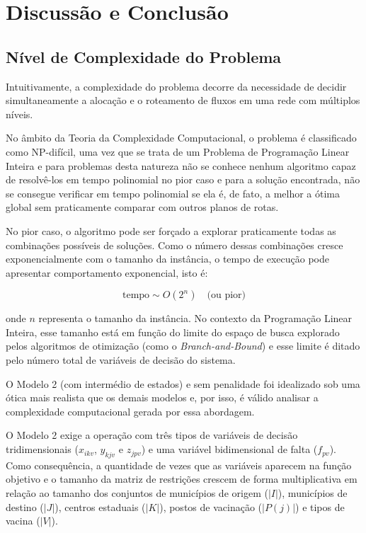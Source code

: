 \chapter{Discussão e Conclusão}

\section{Nível de Complexidade do Problema}

Intuitivamente, a complexidade do problema decorre da necessidade de decidir simultaneamente a alocação e o roteamento de fluxos em uma rede com múltiplos níveis.

No âmbito da Teoria da Complexidade Computacional, o problema é classificado como NP-difícil, uma vez que se trata de um Problema de Programação Linear Inteira e para problemas desta natureza não se conhece nenhum algoritmo capaz de resolvê-los em tempo polinomial no pior caso e para a solução encontrada, não se consegue verificar em tempo polinomial se ela é, de fato, a melhor a ótima global sem praticamente comparar com outros planos de rotas.

No pior caso, o algoritmo pode ser forçado a explorar praticamente todas as combinações possíveis de soluções. Como o número dessas combinações cresce exponencialmente com o tamanho da instância, o tempo de execução pode apresentar comportamento exponencial, isto é:

\[
\text{tempo} \sim O(2^n) \quad \text{(ou pior)}
\]

onde $n$ representa o tamanho da instância. No contexto da Programação Linear Inteira, esse tamanho está em função do limite do espaço de busca explorado pelos algoritmos de otimização (como o \textit{Branch-and-Bound}) e esse limite é ditado pelo número total de variáveis de decisão do sistema.

O Modelo 2 (com intermédio de estados) e sem penalidade foi idealizado sob uma ótica mais realista que os demais modelos e, por isso, é válido analisar a complexidade computacional gerada por essa abordagem.

O Modelo 2 exige a operação com três tipos de variáveis de decisão tridimensionais ($x_{ikv}$, $y_{kjv}$ e $z_{jpv}$) e uma variável bidimensional de falta ($f_{pv}$). Como consequência, a quantidade de vezes que as variáveis aparecem na função objetivo e o tamanho da matriz de restrições crescem de forma multiplicativa em relação ao tamanho dos conjuntos de municípios de origem ($|I|$), municípios de destino ($|J|$), centros estaduais ($|K|$), postos de vacinação ($|P(j)|$) e tipos de vacina ($|V|$).

